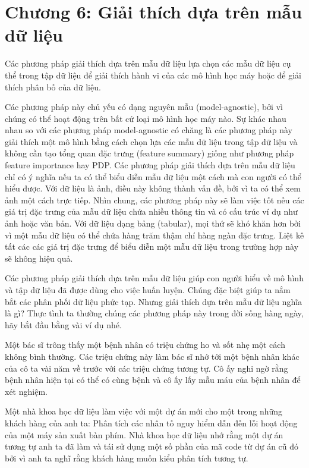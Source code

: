 \chapter*{Chương 6: Giải thích dựa trên mẫu dữ liệu}

Các phương pháp giải thích dựa trên mẫu dữ liệu lựa chọn các mẫu dữ liệu cụ thể trong tập dữ liệu để giải thích hành vi của các mô hình học máy hoặc để giải thích phân bố của dữ liệu.

Các phương pháp này chủ yếu có dạng nguyên mẫu (model-agnostic), bởi vì chúng có thể hoạt động trên bất cứ loại mô hình học máy nào. Sự khác nhau nhau so với các phương pháp model-agnostic có chăng là các phương pháp này giải thích một mô hình bằng cách chọn lựa các mẫu dữ liệu trong tập dữ liệu và không cần tạo tổng quan đặc trưng (feature summary) giống như phương pháp feature importance hay PDP. Các phương pháp giải thích dựa trên mẫu dữ liệu chỉ có ý nghĩa nếu ta có thể biểu diễn mẫu dữ liệu một cách mà con người có thể hiểu được. Với dữ liệu là ảnh, điều này không thành vấn đề, bởi vì ta có thể xem ảnh một cách trực tiếp. Nhìn chung, các phương pháp này sẽ làm việc tốt nếu các giá trị đặc trưng của mẫu dữ liệu chứa nhiều thông tin và có cấu trúc ví dụ như ảnh hoặc văn bản. Với dữ liệu dạng bảng (tabular), mọi thứ sẽ khó khăn hơn bởi vì một mẫu dữ liệu có thể chứa hàng trăm thậm chí hàng ngàn đặc trưng. Liệt kê tất các các giá trị đặc trưng để biểu diễn một mẫu dữ liệu trong trường hợp này sẽ không hiệu quả.

Các phương pháp giải thích dựa trên mẫu dữ liệu giúp con người hiểu về mô hình và tập dữ liệu đã được dùng cho việc huấn luyện. Chúng đặc biệt giúp ta nắm bắt các phân phối dữ liệu phức tạp. Nhưng giải thích dựa trên mẫu dữ liệu nghĩa là gì? Thực tình ta thường chúng các phương pháp này trong đời sống hàng ngày, hãy bắt đầu bằng vài ví dụ nhé.

Một bác sĩ trông thấy một bệnh nhân có triệu chứng ho và sốt nhẹ một cách không bình thường. Các triệu chứng này làm bác sĩ nhớ tới một bệnh nhân khác của cô ta vài năm về trước với các triệu chứng tương tự. Cô ấy nghi ngờ rằng bệnh nhân hiện tại có thể có cùng bệnh và cô ấy lấy mẫu máu của bệnh nhân để xét nghiệm.

Một nhà khoa học dữ liệu làm việc với một dự án mới cho một trong những khách hàng của anh ta: Phân tích các nhân tố nguy hiểm dẫn đến lỗi hoạt động của một máy sản xuất bàn phím. Nhà khoa học dữ liệu nhớ rằng một dự án tương tự anh ta đã làm và tái sử dụng một số phần của mã code từ dự án cũ đó bởi vì anh ta nghĩ rằng khách hàng muốn kiểu phân tích tương tự.

